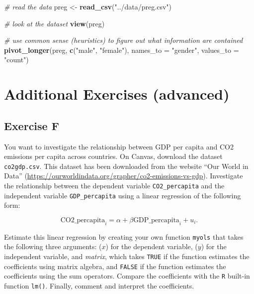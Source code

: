 \documentclass[
]{article}
\newenvironment{Shaded}{\begin{snugshade}}{\end{snugshade}}
\newcommand{\CommentTok}[1]{\textcolor[rgb]{0.56,0.35,0.01}{\textit{#1}}}
\newcommand{\DataTypeTok}[1]{\textcolor[rgb]{0.13,0.29,0.53}{#1}}
\newcommand{\KeywordTok}[1]{\textcolor[rgb]{0.13,0.29,0.53}{\textbf{#1}}}
\newcommand{\NormalTok}[1]{#1}
\newcommand{\StringTok}[1]{\textcolor[rgb]{0.31,0.60,0.02}{#1}}
\begin{document}
\begin{Shaded}
\begin{Highlighting}[]
\CommentTok{\# read the data}
\NormalTok{preg \textless{}{-}}\StringTok{ }\KeywordTok{read\_csv}\NormalTok{(}\StringTok{"../data/preg.csv"}\NormalTok{)}

\CommentTok{\# look at the dataset}
\KeywordTok{view}\NormalTok{(preg)}

\CommentTok{\# use common sense (\textquotesingle{}heuristics\textquotesingle{}) to figure out what information are contained}
\KeywordTok{pivot\_longer}\NormalTok{(preg, }\KeywordTok{c}\NormalTok{(}\StringTok{"male"}\NormalTok{, }\StringTok{"female"}\NormalTok{), }\DataTypeTok{names\_to =} \StringTok{"gender"}\NormalTok{, }\DataTypeTok{values\_to =} \StringTok{"count"}\NormalTok{)}
\end{Highlighting}
\end{Shaded}

\hypertarget{additional-exercises-advanced}{%
\section{Additional Exercises
(advanced)}\label{additional-exercises-advanced}}

\hypertarget{exercise-f}{%
\subsection{Exercise F}\label{exercise-f}}

You want to investigate the relationship between GDP per capita and CO2
emissions per capita across countries. On Canvas, download the dataset
\texttt{co2gdp.csv}. This dataset has been downloaded from the website
``Our World in Data''
(\url{https://ourworldindata.org/grapher/co2-emissions-vs-gdp}).
Investigate the relationship between the dependent variable
\texttt{CO2\_percapita} and the independent variable
\texttt{GDP\_percapita} using a linear regression of the following form:

\[\text{CO2_percapita}_i = \alpha + \beta \text{GDP_percapita}_i + u_i.\]

Estimate this linear regression by creating your own function
\texttt{myols} that takes the following three arguments: (\(x\)) for the
dependent variable, (\(y\)) for the independent variable, and
\textit{matrix}, which takes \texttt{TRUE} if the function estimates the
coefficients using matrix algebra, and \texttt{FALSE} if the function
estimates the coefficients using the sum operators. Compare the
coefficients with the \texttt{R} built-in function \texttt{lm()}.
Finally, comment and interpret the coefficients.
\end{document}
